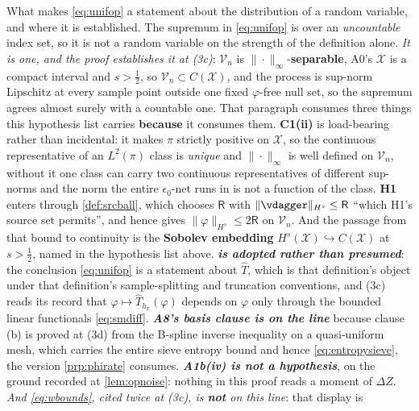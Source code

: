 \begin{lemma}
What makes \eqref{eq:unifop} a statement about the distribution of a random variable, and where it is
established. The supremum in \eqref{eq:unifop} is over an \emph{uncountable} index set, so it is not a random
variable on the strength of the definition alone. \emph{It is one, and the proof establishes it at
\textup{(3c)}}: $\mathcal V_n$ is $\|\cdot\|_\infty$-\textbf{separable}, A0's $\mathcal X$ is a compact
interval and $s>\tfrac12$, so $\mathcal V_n\subset C(\mathcal X)$, and the process is sup-norm Lipschitz at
every sample point outside one fixed $\varphi$-free null set, so the supremum agrees almost surely with a
countable one. That paragraph consumes three things this hypothesis list carries \textbf{because}
it consumes them.
\textbf{C1(ii)} is
load-bearing rather than incidental: it makes $\pi$ strictly positive on $\mathcal X$, so the continuous
representative of an $L^{2}(\pi)$ class is \emph{unique} and $\|\cdot\|_\infty$ is well defined on
$\mathcal V_n$, without it one class can carry two continuous representatives of different sup-norms and
the norm the entire $\epsilon_0$-net runs in is not a function of the class. \textbf{H1} enters through
\cref{def:srcball}, which chooses $\mathsf R$ with $\|\vdagger\|_{H^{s}}\le\mathsf R$ ``which H1's source
set permits'', and hence gives $\|\varphi\|_{H^{s}}\le2\mathsf R$ on $\mathcal V_n$. And the passage from
that bound to continuity is the \textbf{Sobolev embedding} $H^{s}(\mathcal X)\hookrightarrow C(\mathcal X)$
at $s>\tfrac12$, named in the hypothesis list above.
\emph{\textbf{ is adopted rather than presumed}}: the conclusion \eqref{eq:unifop} is
a statement about $\hat T$, which is that definition's object under that definition's sample-splitting and
truncation conventions, and (3c) reads its record that $\varphi\mapsto\hat T_{h_x}(\varphi)$ depends on
$\varphi$ only through the bounded linear functionals \eqref{eq:smdiff}.
\emph{\textbf{A8's basis clause is on the line}} because clause (b) is proved
at (3d) from the B-spline inverse inequality on a quasi-uniform mesh, which carries the entire sieve
entropy bound and hence \eqref{eq:entropysieve}, the version \cref{prp:phirate} consumes.
\emph{\textbf{A1b(iv) is \textbf{not} a hypothesis}}, on the ground recorded at \cref{lem:opnoise}:
nothing in this proof reads a moment of $\Delta Z$.
\emph{And \eqref{eq:wbounds}, cited twice at (3c), is \textbf{not} on this line}: that display is

\end{lemma}
